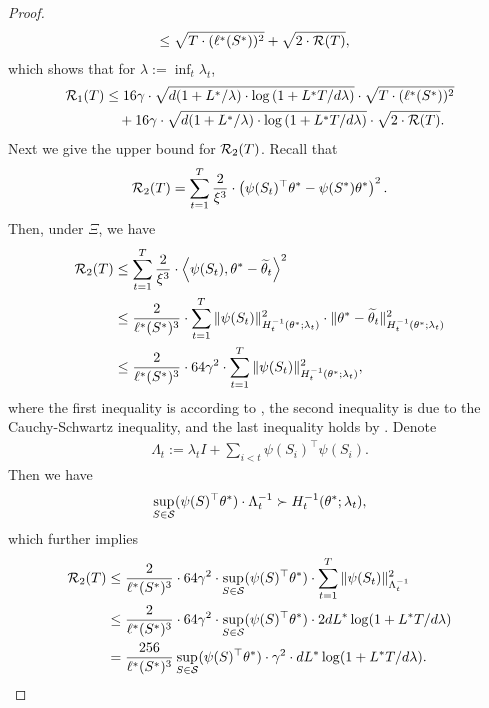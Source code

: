 \begin{theorem}
\begin{proof}
\begin{align*}
    &\le \sqrt{T\cdot (\ell^*(S^*))^2 } + \sqrt{2 \cdot {\mathcal{R}}(T)},
\end{align*}
which shows that for $\lambda := \inf_t \lambda_t$, 
\begin{align*}
    {\mathcal{R}}_1(T) &\le 16\gamma \cdot \sqrt{d(1 + L^*/\lambda) \cdot \log\left(1 + L^*T/d\lambda\right)} \cdot \sqrt{T\cdot (\ell^*(S^*))^2 } \\
    &\quad + 16\gamma \cdot \sqrt{d(1 + L^*/\lambda) \cdot \log\left(1 + L^*T/d\lambda\right)} \cdot \sqrt{2 \cdot {\mathcal{R}}(T)}.
\end{align*}
Next we give the upper bound for ${\mathcal{R}}_2(T)$. Recall that 
\begin{align*}
    {\mathcal{R}}_2(T) = \sum_{t=1}^T \frac{2}{\xi^3} \cdot \left(\psi(S_t)^\top \theta^* - \psi(S^*)\theta^*\right)^2.
\end{align*}
Then, under $\Xi$, we have
\begin{align*}
    {\mathcal{R}}_2(T) &\le \sum_{t=1}^T \frac{2}{\xi^3} \cdot \left\langle\psi(S_t) ,\theta^* - \widetilde{\theta}_t\right\rangle^2 \\
    &\le  \frac{2}{\ell^*(S^*)^3} \cdot \sum_{t=1}^T \|\psi(S_t)\|^2_{H_t^{-1}(\theta^*; \lambda_t)} \cdot \|\theta^* - \widetilde{\theta}_t\|^2_{H_t^{-1}(\theta^*; \lambda_t)} \\
    &\le \frac{2}{\ell^*(S^*)^3} \cdot 64\gamma^2 \cdot \sum_{t=1}^T \|\psi(S_t)\|^2_{H_t^{-1}(\theta^*; \lambda_t)},
\end{align*}
where the first inequality is according to , the second inequality is due to the Cauchy-Schwartz inequality, and the last inequality holds by . Denote
\begin{align*}
    \Lambda_t := \lambda_t I + \sum_{i < t} \psi(S_i)^\top \psi(S_i). 
\end{align*}
Then we have
\begin{align*}
    \sup_{S \in {\mathcal{S}}} (\psi(S)^\top \theta^*) \cdot \Lambda_t^{-1} \succ H_t^{-1}(\theta^*; \lambda_t),
\end{align*}
which further implies
\begin{align*}
    \gR_2(T) &\le \frac{2}{\ell^*(S^*)^3} \cdot 64\gamma^2 \cdot \sup_{S \in \gS} (\psi(S)^\top \theta^*) \cdot \sum_{t=1}^T \|\psi(S_t)\|^2_{\Lambda_t^{-1}} \\
    &\le \frac{2}{\ell^*(S^*)^3} \cdot 64\gamma^2 \cdot \sup_{S \in \gS} (\psi(S)^\top \theta^*) \cdot 2dL^*\log(1 + L^* T/d\lambda) \\
    &= \frac{256}{\ell^*(S^*)^3} \sup_{S \in \gS} (\psi(S)^\top \theta^*) \cdot \gamma^2 \cdot dL^*\log(1 + L^*T/d\lambda).

\end{align*}
\end{proof}
\end{theorem}
